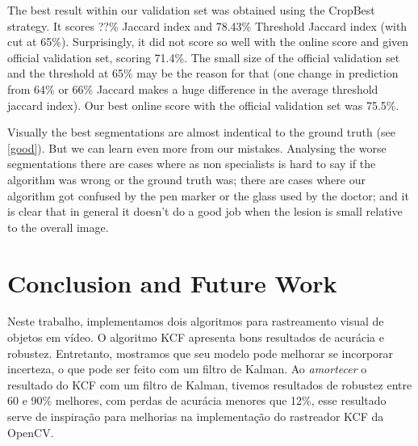 \documentclass[conference]{IEEEtran}
\begin{document}
The best result within our validation set was obtained using the CropBest strategy.  It scores ??\% Jaccard index and 78.43\% Threshold Jaccard index (with cut at 65\%). Surprisingly, it did not score so well with the online score and given official validation set, scoring 71.4\%.  The small size of the official validation set and the threshold at 65\% may be the reason for that (one change in prediction from 64\% or 66\% Jaccard makes a huge difference in the average threshold jaccard index). Our best online score with the official validation set was 75.5\%. 

Visually the best segmentations are almost indentical to the ground truth (see \ref{good}). But we can learn even more from our mistakes. Analysing the worse segmentations there are cases where as non specialists is hard to say if the algorithm was wrong or the ground truth was; there are cases where our algorithm got confused by the pen marker or the glass used by the doctor; and it is clear that in general it doesn't do a good job when the lesion is small relative to the overall image. 




\section{Conclusion and Future Work}
Neste trabalho, implementamos dois algoritmos para rastreamento visual de objetos em vídeo. O algoritmo KCF apresenta bons resultados de acurácia e robustez.  Entretanto, mostramos que seu modelo pode melhorar se incorporar incerteza, o que pode ser feito com um filtro de Kalman. Ao \textit{amortecer}  o resultado do KCF com um filtro de Kalman, tivemos resultados de robustez entre 60 e 90\% melhores, com perdas de acurácia menores que 12\%, esse resultado serve de inspiração para melhorias na implementação do rastreador KCF da OpenCV. 




\end{document}
